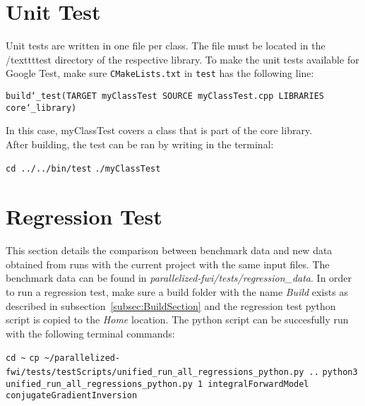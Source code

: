 \documentclass[10pt]{article}
\begin{document}
\section{Unit Test}

Unit tests are written in one file per class. The file must be located in the /texttt{test} directory of the respective library. To make the unit tests available for Google Test, make sure \texttt{CMakeLists.txt} in \texttt{test} has the following line:
\newline

\texttt{build\char`_test(TARGET myClassTest SOURCE myClassTest.cpp LIBRARIES core\char`_library)}
\newline

In this case, myClassTest covers a class that is part of the core library.\\
After building, the test can be ran by writing in the terminal:\\
\newline

\texttt{cd ../../bin/test}
\newline
\texttt{./myClassTest}
\newline

\section{Regression Test}
This section details the comparison between benchmark data and new data obtained from runs with the current project with the same input files. The benchmark data can be found in \textit{parallelized-fwi/tests/regression\_data}. In order to run a regression test, make sure a build folder with the name \textit{Build} exists as described in subsection~\ref{subsec:BuildSection} and the regression test python script is copied to the \textit{Home} location. The python script can be succesfully run with the following terminal commands:
\newline

\texttt{cd \~}
\newline
\texttt{cp \textasciitilde/parallelized-fwi/tests/testScripts/unified\_run\_all\_regressions\_python.py ..}
\newline
\texttt{python3 unified\_run\_all\_regressions\_python.py 1 integralForwardModel conjugateGradientInversion}
\newline
\end{document}
